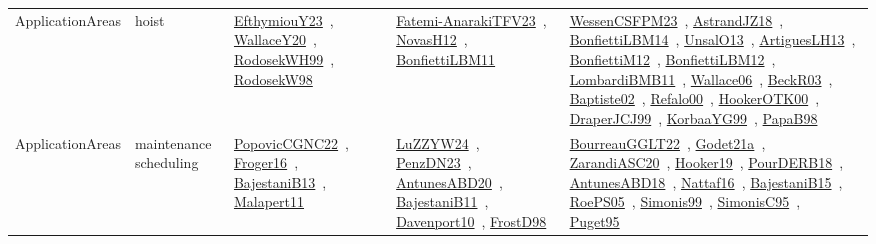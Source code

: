 {\begin{longtable}{lp{3cm}>{\raggedright\arraybackslash}p{6cm}>{\raggedright\arraybackslash}p{6cm}>{\raggedright\arraybackslash}p{8cm}}
\index{hoist}\index{ApplicationAreas!hoist}ApplicationAreas & hoist & \href{../works/EfthymiouY23.pdf}{EfthymiouY23}~\cite{EfthymiouY23}, \href{../works/WallaceY20.pdf}{WallaceY20}~\cite{WallaceY20}, \href{../works/RodosekWH99.pdf}{RodosekWH99}~\cite{RodosekWH99}, \href{../works/RodosekW98.pdf}{RodosekW98}~\cite{RodosekW98} & \href{../works/Fatemi-AnarakiTFV23.pdf}{Fatemi-AnarakiTFV23}~\cite{Fatemi-AnarakiTFV23}, \href{../works/NovasH12.pdf}{NovasH12}~\cite{NovasH12}, \href{../works/BonfiettiLBM11.pdf}{BonfiettiLBM11}~\cite{BonfiettiLBM11} & \href{../works/WessenCSFPM23.pdf}{WessenCSFPM23}~\cite{WessenCSFPM23}, \href{../works/AstrandJZ18.pdf}{AstrandJZ18}~\cite{AstrandJZ18}, \href{../works/BonfiettiLBM14.pdf}{BonfiettiLBM14}~\cite{BonfiettiLBM14}, \href{../works/UnsalO13.pdf}{UnsalO13}~\cite{UnsalO13}, \href{../works/ArtiguesLH13.pdf}{ArtiguesLH13}~\cite{ArtiguesLH13}, \href{../works/BonfiettiM12.pdf}{BonfiettiM12}~\cite{BonfiettiM12}, \href{../works/BonfiettiLBM12.pdf}{BonfiettiLBM12}~\cite{BonfiettiLBM12}, \href{../works/LombardiBMB11.pdf}{LombardiBMB11}~\cite{LombardiBMB11}, \href{../works/Wallace06.pdf}{Wallace06}~\cite{Wallace06}, \href{../works/BeckR03.pdf}{BeckR03}~\cite{BeckR03}, \href{../works/Baptiste02.pdf}{Baptiste02}~\cite{Baptiste02}, \href{../works/Refalo00.pdf}{Refalo00}~\cite{Refalo00}, \href{../works/HookerOTK00.pdf}{HookerOTK00}~\cite{HookerOTK00}, \href{../works/DraperJCJ99.pdf}{DraperJCJ99}~\cite{DraperJCJ99}, \href{../works/KorbaaYG99.pdf}{KorbaaYG99}~\cite{KorbaaYG99}, \href{../works/PapaB98.pdf}{PapaB98}~\cite{PapaB98}\\
\index{maintenance scheduling}\index{ApplicationAreas!maintenance scheduling}ApplicationAreas & maintenance scheduling & \href{../works/PopovicCGNC22.pdf}{PopovicCGNC22}~\cite{PopovicCGNC22}, \href{../works/Froger16.pdf}{Froger16}~\cite{Froger16}, \href{../works/BajestaniB13.pdf}{BajestaniB13}~\cite{BajestaniB13}, \href{../works/Malapert11.pdf}{Malapert11}~\cite{Malapert11} & \href{../works/LuZZYW24.pdf}{LuZZYW24}~\cite{LuZZYW24}, \href{../works/PenzDN23.pdf}{PenzDN23}~\cite{PenzDN23}, \href{../works/AntunesABD20.pdf}{AntunesABD20}~\cite{AntunesABD20}, \href{../works/BajestaniB11.pdf}{BajestaniB11}~\cite{BajestaniB11}, \href{../works/Davenport10.pdf}{Davenport10}~\cite{Davenport10}, \href{../works/FrostD98.pdf}{FrostD98}~\cite{FrostD98} & \href{../works/BourreauGGLT22.pdf}{BourreauGGLT22}~\cite{BourreauGGLT22}, \href{../works/Godet21a.pdf}{Godet21a}~\cite{Godet21a}, \href{../works/ZarandiASC20.pdf}{ZarandiASC20}~\cite{ZarandiASC20}, \href{../works/Hooker19.pdf}{Hooker19}~\cite{Hooker19}, \href{../works/PourDERB18.pdf}{PourDERB18}~\cite{PourDERB18}, \href{../works/AntunesABD18.pdf}{AntunesABD18}~\cite{AntunesABD18}, \href{../works/Nattaf16.pdf}{Nattaf16}~\cite{Nattaf16}, \href{../works/BajestaniB15.pdf}{BajestaniB15}~\cite{BajestaniB15}, \href{../works/RoePS05.pdf}{RoePS05}~\cite{RoePS05}, \href{../works/Simonis99.pdf}{Simonis99}~\cite{Simonis99}, \href{../works/SimonisC95.pdf}{SimonisC95}~\cite{SimonisC95}, \href{../works/Puget95.pdf}{Puget95}~\cite{Puget95}\\

\end{longtable}}
